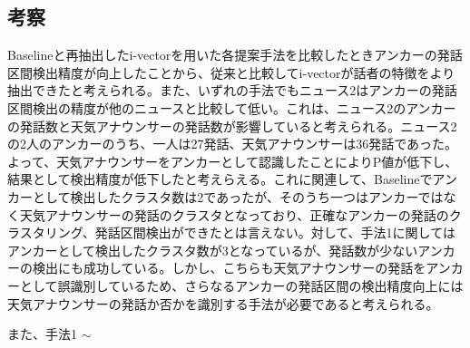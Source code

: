 \subsection{考察}
Baselineと再抽出したi-vectorを用いた各提案手法を比較したときアンカーの発話区間検出精度が向上したことから、従来と比較してi-vectorが話者の特徴をより抽出できたと考えられる。また、いずれの手法でもニュース2はアンカーの発話区間検出の精度が他のニュースと比較して低い。これは、ニュース2のアンカーの発話数と天気アナウンサーの発話数が影響していると考えられる。ニュース2の2人のアンカーのうち、一人は27発話、天気アナウンサーは36発話であった。よって、天気アナウンサーをアンカーとして認識したことによりP値が低下し、結果として検出精度が低下したと考えらえる。これに関連して、Baselineでアンカーとして検出したクラスタ数は2であったが、そのうち一つはアンカーではなく天気アナウンサーの発話のクラスタとなっており、正確なアンカーの発話のクラスタリング、発話区間検出ができたとは言えない。対して、手法1に関してはアンカーとして検出したクラスタ数が3となっているが、発話数が少ないアンカーの検出にも成功している。しかし、こちらも天気アナウンサーの発話をアンカーとして誤識別しているため、さらなるアンカーの発話区間の検出精度向上には天気アナウンサーの発話か否かを識別する手法が必要であると考えられる。\par
また、手法1 $\sim$